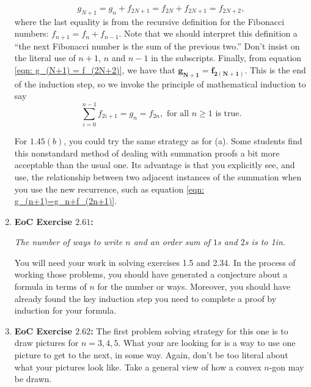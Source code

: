 \documentclass[12pt,letterpaper]{article}
\theoremstyle{definition}
\begin{document}
\begin{enumerate}
\begin{equation}
        g_{N+1} = g_n+f_{2N+1} = f_{2N} + f_{2N+1} = f_{2N+2},
    \end{equation}
    where the last equality is from the recursive definition for the
    Fibonacci numbers: $f_{n+1}=f_n+f_{n-1}$. Note that we should interpret
    this definition a ``the next Fibonacci number is the sum of the previous
    two.'' Don't insist on the literal use of $n+1$, $n$ and $n-1$ in the
    subscripts. Finally, from equation \eqref{eqn: g_(N+1) = f_(2N+2)}, we
    have that $\mathbf{g_{N+1}=f_{2(N+1)}}$. This is the end of the induction
    step, so we invoke the principle of mathematical induction to say
    \[
      \sum_{i=0}^{n-1} f_{2i+1} = g_n = f_{2n},\text{ for all $n\geq 1$ is
                                                      true.}
    \]
    
    For $1.45(b)$, you could try the same strategy as for (a). Some students
    find this nonstandard method of dealing with summation proofs a bit more
    acceptable than the usual one. Its advantage is that you explicitly see,
    and use, the relationship between two adjacent instances of the summation
    when you use the new recurrence, such as equation \eqref{eqn:
    g_(n+1)=g_n+f_(2n+1)}.
    
    \item {\bfseries EoC Exercise $2.61$:} 
    \begin{center}
        \textit{The number of ways to write $n$ and an order sum of $1$s and
        $2$s is \hbox to 1in{\hrulefill}.}
    \end{center}
    You will need your work in solving exercises 1.5 and 2.34. In the process
    of working those problems, you should have generated a conjecture about a
    formula in terms of $n$ for the number or ways. Moreover, you should have
    already found the key induction step you need to complete a proof by
    induction for your formula.
    
    \item {\bfseries EoC Exercise $2.62$:} The first problem solving strategy
    for this one is to draw pictures for $n=3,4,5$. What your are looking for
    is a way to use one picture to get to the next, in some way. Again, don't
    be too literal about what your pictures look like. Take a general view of
    how a convex $n$-gon may be drawn.
    

\end{enumerate}
\end{document}
